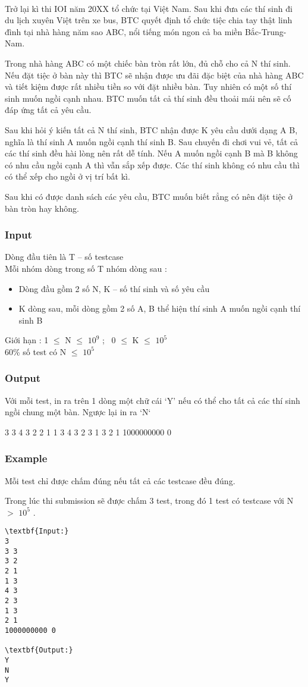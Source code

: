 

 

Trở lại kì thi IOI năm 20XX tổ chức tại Việt Nam. Sau khi đưa các thí sinh đi du lịch xuyên Việt trên xe bus, BTC quyết định tổ chức tiệc chia tay thật linh đình tại nhà hàng năm sao ABC, nổi tiếng món ngon cả ba miền Bắc-Trung-Nam.

Trong nhà hàng ABC có một chiếc bàn tròn rất lớn, đủ chỗ cho cả N thí sinh. Nếu đặt tiệc ở bàn này thì BTC sẽ nhận được ưu đãi đặc biệt của nhà hàng ABC và tiết kiệm được rất nhiều tiền so với đặt nhiều bàn. Tuy nhiên có một số thí sinh muốn ngồi cạnh nhau. BTC muốn tất cả thí sinh đều thoải mái nên sẽ cố đáp ứng tất cả yêu cầu.

Sau khi hỏi ý kiến tất cả N thí sinh, BTC nhận được K yêu cầu dưới dạng A B, nghĩa là thí sinh A muốn ngồi cạnh thí sinh B. Sau chuyến đi chơi vui vẻ, tất cả các thí sinh đều hài lòng nên rất dễ tính. Nếu A muốn ngồi cạnh B mà B không có nhu cầu ngồi cạnh A thì vẫn sắp xếp được. Các thí sinh không có nhu cầu thì có thể xếp cho ngồi ở vị trí bất kì.

Sau khi có được danh sách các yêu cầu, BTC muốn biết rẳng có nên đặt tiệc ở bàn tròn hay không.

\subsubsection{Input}

Dòng đầu tiên là T – số testcase
\\Mỗi nhóm dòng trong số T nhóm dòng sau :
\begin{itemize}
	\item Dòng đầu gồm 2 số N, K – số thí sinh và số yêu cầu
	\item K dòng sau, mỗi dòng gồm 2 số A, B thể hiện thí sinh A muốn ngồi cạnh thí sinh B
\end{itemize}

Giới hạn : 1  $\le$  N  $\le$  $10^{9}$ ;  0  $\le$  K  $\le$  $10^{5}$
\\60\% số test có N  $\le$  $10^{5}$

\subsubsection{Output}

Với mỗi test, in ra trên 1 dòng một chữ cái ‘Y’ nếu có thể cho tất cả các thí sinh ngồi chung một bàn. Ngược lại in ra ‘N‘

3 3 4 3 2 2 1 1 3 4 3 2 3 1 3 2 1 1000000000 0

\subsubsection{Example}

Mỗi test chỉ được chấm đúng nếu tất cả các testcase đều đúng.

Trong lúc thi submission sẽ được chấm 3 test, trong đó 1 test có testcase với N $>$ $10^{5}$ .
\begin{verbatim}
\textbf{Input:}
3
3 3
3 2
2 1
1 3
4 3
2 3
1 3
2 1
1000000000 0

\textbf{Output:}
Y
N
Y\end{verbatim}
